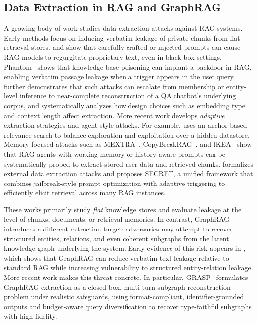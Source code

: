 

\subsection{Data Extraction in RAG and GraphRAG}
\label{data_extraction_appendix}

A growing body of work studies data extraction attacks against RAG systems. Early methods focus on inducing verbatim leakage of private chunks from flat retrieval stores. \citealp{zeng2024good} and \citealp{qifollow} show that carefully crafted or injected prompts can cause RAG models to regurgitate proprietary text, even in black-box settings. 
Phantom~\cite{chaudhari2024phantom} shows that knowledge-base poisoning can implant a backdoor in RAG, enabling verbatim passage leakage when a trigger appears in the user query. 
\citealp{cohen2024unleashing} further demonstrates that such attacks can escalate from membership or entity-level inference to near-complete reconstruction of a QA chatbot’s underlying corpus, and systematically analyzes how design choices such as embedding type and context length affect extraction.
More recent work develops \emph{adaptive} extraction strategies and agent-style attacks. For example, \citealp{di2024pirates} uses an anchor-based relevance search to balance exploration and exploitation over a hidden datastore. Memory-focused attacks such as MEXTRA~\cite{wang2025unveiling}, CopyBreakRAG~\cite{jiang2025feedback}, and IKEA~\cite{wang2025silent} show that RAG agents with working memory or history-aware prompts can be systematically probed to extract stored user data and retrieved chunks. \cite{he2025external} formalizes external data extraction attacks and proposes SECRET, a unified framework that combines jailbreak-style prompt optimization with adaptive triggering to efficiently elicit retrieval across many RAG instances.

These works primarily study \emph{flat} knowledge stores and evaluate leakage at the level of chunks, documents, or retrieval memories. In contrast, GraphRAG introduces a different extraction target: adversaries may attempt to recover structured entities, relations, and even coherent subgraphs from the latent knowledge graph underlying the system. 
Early evidence of this risk appears in \citealp{liu2025exposing}, which shows that GraphRAG can reduce verbatim text leakage relative to standard RAG while increasing vulnerability to structured entity-relation leakage. 
More recent work makes this threat concrete. In particular, GRASP~\cite{song2026subgraph} formulates GraphRAG extraction as a closed-box, multi-turn subgraph reconstruction problem under realistic safeguards, using format-compliant, identifier-grounded outputs and budget-aware query diversification to recover type-faithful subgraphs with high fidelity.

